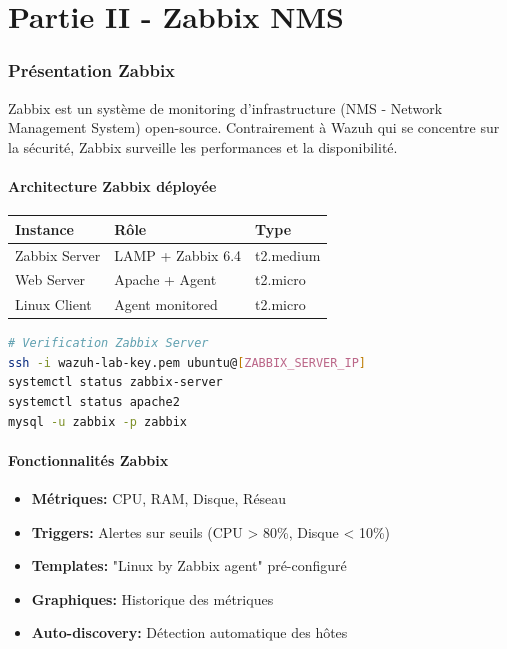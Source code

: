 \documentclass[12pt,a4paper]{article}
\begin{document}
\part{Partie II - Zabbix NMS}

\section{Présentation Zabbix}

Zabbix est un système de monitoring d'infrastructure (NMS - Network Management System) open-source. Contrairement à Wazuh qui se concentre sur la sécurité, Zabbix surveille les performances et la disponibilité.

\subsection{Architecture Zabbix déployée}

\begin{center}
\begin{tabular}{|l|l|l|}
\hline
\textbf{Instance} & \textbf{Rôle} & \textbf{Type} \\
\hline
Zabbix Server & LAMP + Zabbix 6.4 & t2.medium \\
Web Server & Apache + Agent & t2.micro \\
Linux Client & Agent monitored & t2.micro \\
\hline
\end{tabular}
\end{center}

\begin{lstlisting}[language=bash]
# Verification Zabbix Server
ssh -i wazuh-lab-key.pem ubuntu@[ZABBIX_SERVER_IP]
systemctl status zabbix-server
systemctl status apache2
mysql -u zabbix -p zabbix
\end{lstlisting}

\subsection{Fonctionnalités Zabbix}

\begin{itemize}
    \item \textbf{Métriques:} CPU, RAM, Disque, Réseau
    \item \textbf{Triggers:} Alertes sur seuils (CPU > 80\%, Disque < 10\%)
    \item \textbf{Templates:} "Linux by Zabbix agent" pré-configuré
    \item \textbf{Graphiques:} Historique des métriques
    \item \textbf{Auto-discovery:} Détection automatique des hôtes
\end{itemize}
\end{document}
